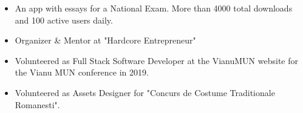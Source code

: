 \begin{itemize}
    \item An app with essays for a National Exam. More than 4000 total downloads and 100 active users daily.
\end{itemize}
\begin{itemize}
    \item Organizer \& Mentor at "Hardcore Entrepreneur"
    \item Volunteered as Full Stack Software Developer at the VianuMUN website for the Vianu MUN conference in 2019.
    \item Volunteered as Assets Designer for "Concurs de Costume Traditionale Romanesti".
\end{itemize}